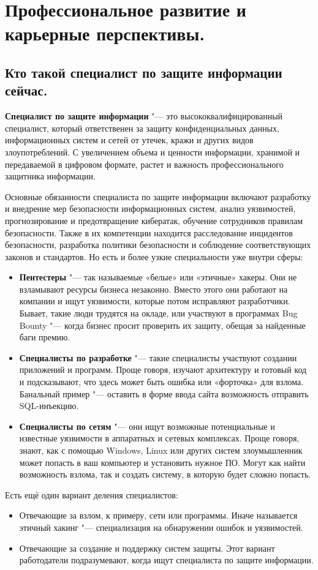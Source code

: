 \section{Профессиональное развитие и карьерные перспективы.}
\subsection{Кто такой специалист по защите информации сейчас.}
\textbf{Специалист по защите информации} "---  это высококвалифицированный специалист, который ответственен за защиту конфиденциальных 
данных, информационных систем и сетей от утечек, кражи и других видов злоупотреблений. С увеличением объема и ценности 
информации, хранимой и передаваемой в цифровом формате, растет и важность профессионального защитника информации.

Основные обязанности специалиста по защите информации включают разработку и внедрение мер безопасности информационных систем, 
анализ уязвимостей, прогнозирование и предотвращение кибератак, обучение сотрудников правилам безопасности. Также в их 
компетенции находится расследование инцидентов безопасности, разработка политики безопасности и соблюдение соответствующих 
законов и стандартов.
Но есть и более узкие специальности уже внутри сферы:
\begin{itemize}
    \item \textbf{Пентестеры} "---  так называемые «белые» или «этичные» хакеры. Они не взламывают ресурсы бизнеса незаконно. Вместо 
    этого они работают на компании и ищут уязвимости, которые потом исправляют разработчики. Бывает, такие люди трудятся на 
    окладе, или участвуют в программах Bug Bounty "---  когда бизнес просит проверить их защиту, обещая за найденные баги премию.
    \item \textbf{Специалисты по разработке} "--- такие специалисты участвуют создании приложений и программ. Проще говоря, 
    изучают архитектуру и готовый код и подсказывают, что здесь может быть ошибка или «форточка» для взлома. Банальный пример 
    "---  оставить в форме ввода сайта возможность отправить SQL-инъекцию.
    \item \textbf{Специалисты по сетям} "---  они ищут возможные потенциальные и известные уязвимости в аппаратных и сетевых 
    комплексах. Проще говоря, знают, как с помощью Windows, Linux или других систем злоумышленник может попасть в ваш 
    компьютер и установить нужное ПО. Могут как найти возможность взлома, так и создать систему, в которую будет сложно 
    попасть.
\end{itemize}
Есть ещё один вариант деления специалистов:
\begin{itemize}
    \item Отвечающие за взлом, к примеру, сети или программы. Иначе называется этичный хакинг "---  специализация на обнаружении ошибок и уязвимостей.
    \item Отвечающие за создание и поддержку систем защиты. Этот вариант работодатели подразумевают, когда ищут специалиста по защите информации.
    \cite{habr}
\end{itemize}

